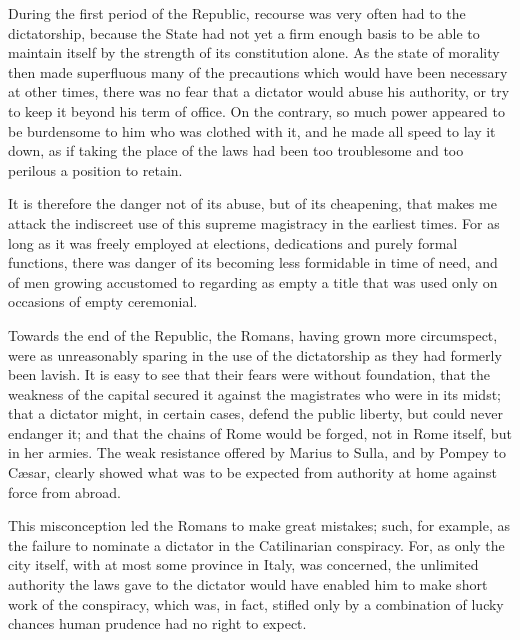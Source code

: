 \documentclass[12pt]{book}
\begin{document}
During the first period of the Republic, recourse was very often had to the dictatorship, because the State had not yet a firm enough basis to be able to maintain itself by the strength of its constitution alone. As the state of morality then made superfluous many of the precautions which would have been necessary at other times, there was no fear that a dictator would abuse his authority, or try to keep it beyond his term of office. On the contrary, so much power appeared to be burdensome to him who was clothed with it, and he made all speed to lay it down, as if taking the place of the laws had been too troublesome and too perilous a position to retain.

It is therefore the danger not of its abuse, but of its cheapening, that makes me attack the indiscreet use of this supreme magistracy in the earliest times. For as long as it was freely employed at elections, dedications and purely formal functions, there was danger of its becoming less formidable in time of need, and of men growing accustomed to regarding as empty a title that was used only on occasions of empty ceremonial.

Towards the end of the Republic, the Romans, having grown more circumspect, were as unreasonably sparing in the use of the dictatorship as they had formerly been lavish. It is easy to see that their fears were without foundation, that the weakness of the capital secured it against the magistrates who were in its midst; that a dictator might, in certain cases, defend the public liberty, but could never endanger it; and that the chains of Rome would be forged, not in Rome itself, but in her armies. The weak resistance offered by Marius to Sulla, and by Pompey to Cæsar, clearly showed what was to be expected from authority at home against force from abroad.

This misconception led the Romans to make great mistakes; such, for example, as the failure to nominate a dictator in the Catilinarian conspiracy. For, as only the city itself, with at most some province in Italy, was concerned, the unlimited authority the laws gave to the dictator would have enabled him to make short work of the conspiracy, which was, in fact, stifled only by a combination of lucky chances human prudence had no right to expect.
\end{document}
